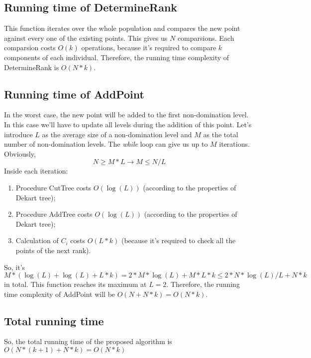 \documentclass{article}
\begin{document}
\subsection{Running time of DetermineRank}
This function iterates over the whole population and compares the new point
against every one of the existing points. This gives us $N$ comparsions. Each
comparsion costs $O(k)$ operations, because it's required to compare $k$ components of each
individual.
Therefore, the running time complexity of DetermineRank is $O(N * k)$.
\subsection{Running time of AddPoint}
In the worst case, the new point will be added to the first non-domination
level. In this case we'll have to update all levels during the addition of this
point.
Let's introduce $L$ as the average size of a non-domination level and $M$ as the 
total number of non-domination levels.
The \textit{while} loop can give us up to $M$ iterations.
Obviously, \begin{equation} \label{eq:nlm}N \geq M * L \rightarrow M \leq N / L
\end{equation}
Inside each iteration:
\begin{enumerate}
  \item Procedure CutTree costs $O(\log(L))$ (according to the properties of
  Dekart tree);
  \item Procedure AddTree costs $O(\log(L))$ (according to the properties of
  Dekart tree);
  \item Calculation of $C_i$ costs $O(L * k)$ (because it's required to check
  all the points of the next rank).
\end{enumerate}
So, it's $M *(\log(L) + \log(L) + L * k) = 2 * M * \log(L) + M * L * k \leq 2 *
N * \log(L) / L + N * k$ in total.
This function reaches its maximum at $L = 2$.
Therefore, the running time complexity of AddPoint will be $O(N + N * k) =
O(N * k)$.
\subsection{Total running time}
So, the total running time of the proposed algorithm is $O(N * (k + 1) + N * k)
= O(N * k)$
\end{document}
